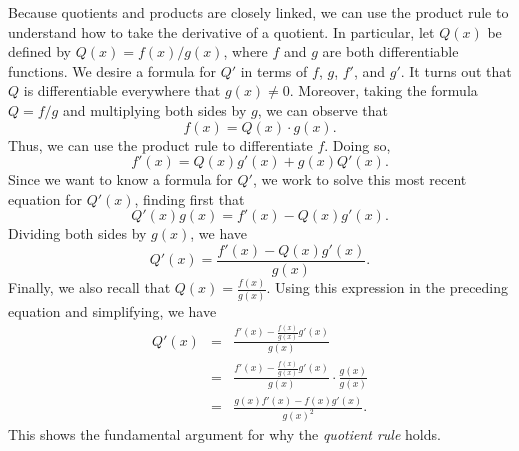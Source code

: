 Because quotients and products are closely linked, we can use the product rule to understand how to take the derivative of a quotient.  In particular, let $Q(x)$ be defined by $Q(x) = f(x)/g(x)$, where $f$ and $g$ are both differentiable functions.  We desire a formula for $Q'$ in terms of $f$, $g$, $f'$, and $g'$.  It turns out that $Q$ is differentiable everywhere that $g(x) \ne 0$.  Moreover, taking the formula $Q = f/g$ and multiplying both sides by $g$, we can observe that 
$$f(x) = Q(x) \cdot g(x).$$
Thus, we can use the product rule to differentiate $f$.  Doing so,
$$f'(x) = Q(x) g'(x) + g(x) Q'(x).$$
Since we want to know a formula for $Q'$, we work to solve this most recent equation for $Q'(x)$, finding first that
$$Q'(x) g(x) = f'(x) - Q(x) g'(x).$$
Dividing both sides by $g(x)$, we have
$$Q'(x) = \frac{f'(x) - Q(x) g'(x)}{g(x)}.$$
Finally, we also recall that $Q(x) = \frac{f(x)}{g(x)}.$  Using this expression in the preceding equation and simplifying, we have
\begin{eqnarray*}
Q'(x) & = & \frac{f'(x) - \frac{f(x)}{g(x)} g'(x)}{g(x)} \\
	& = & \frac{f'(x) - \frac{f(x)}{g(x)} g'(x)}{g(x)} \cdot \frac{g(x)}{g(x)} \\
	& = & \frac{g(x) f'(x) -  f(x) g'(x)}{g(x)^2}. 
\end{eqnarray*}
This shows the fundamental argument for why the \emph{quotient rule} holds.

\vspace*{5pt}
\nin {}
\vspace*{1pt}

